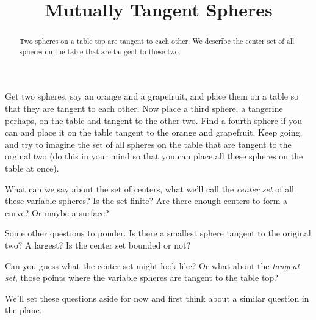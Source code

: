 \documentclass{ximera}
\title{Mutually Tangent Spheres}
\begin{document}
\begin{abstract}
Two spheres on a table top are tangent to each other. We describe the center set of all spheres on the table that are tangent to these two. 
\end{abstract}
\maketitle

Get two spheres, say an orange and a grapefruit, and place them on a table so that they are tangent to each other. Now place a third sphere, a tangerine perhaps, on the table and tangent to the other two. Find a fourth sphere if you can and place it on the table tangent to the orange and grapefruit. Keep going, and try to imagine the set of all spheres on the table that are tangent to the orginal two (do this in your mind so that you can place all these spheres on the table at once). 

What can we say about the set of centers, what we'll call the \emph{center set} of all these variable spheres? Is the set finite? Are there enough centers to form a curve? Or maybe a surface?

Some other questions to ponder. Is there a smallest sphere tangent to the original two? A largest? Is the center set bounded or not?

Can you guess what the center set might look like? Or what about the \emph{tangent-set}, those points where the variable spheres are tangent to the table top?


We'll set these questions aside for now and first think about a similar question in the plane.
\end{document}
